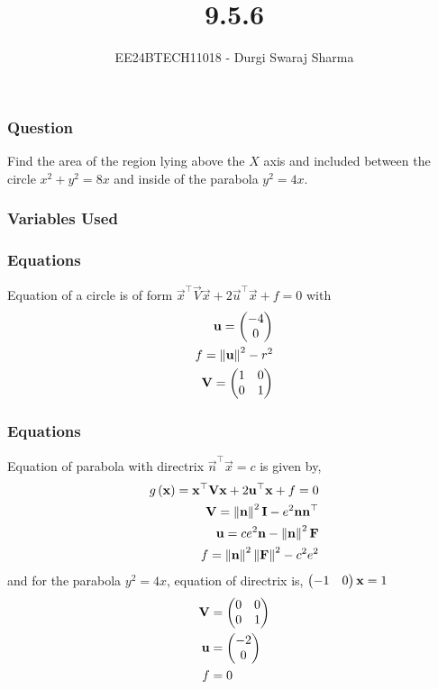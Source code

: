 \documentclass{beamer}
\begin{document}
\title{9.5.6}
\author{EE24BTECH11018 - Durgi Swaraj Sharma}
\date{}
\frame{\titlepage}

\begin{frame}
\frametitle{Question}
Find the area of the region lying above the $X$ axis and included between the circle $x^2+y^2=8x$ and inside of the parabola $y^2=4x$. \hfill {}
\end{frame}

\begin{frame}
\frametitle{Variables Used}
\begin{table}[h!] 
  \centering
  
  \label{tab9-5.6-1}
\end{table}
\end{frame}
\begin{frame}
\frametitle{Equations}
Equation of a circle is of form $\vec{x}^{\top}\vec{V}\vec{x}+2\vec{u}^{\top}\vec{x}+f=0$ with
\begin{align}
	\mathbf{u}=\begin{pmatrix}-4\\0\end{pmatrix}\\
	f=\left\lVert\mathbf{u}\right\rVert^2-r^2\\
	\mathbf{V}=\begin{pmatrix}1&0\\0&1\end{pmatrix}
\end{align}
\end{frame}

\begin{frame}
	\frametitle{Equations}
Equation of parabola with directrix $\vec{n}^{\top}\vec{x}=c$ is given by,
\begin{align}
	g\left(\mathbf{x}\right)=\mathbf{x}^{\top}\mathbf{V}\mathbf{x}+2\mathbf{u}^{\top}\mathbf{x}+f=0\\
	\mathbf{V}=\left\lVert\mathbf{n}\right\rVert^2\mathbf{I}-e^2\mathbf{n}\mathbf{n}^{\top}\\
	\mathbf{u}=ce^2\mathbf{n}-\left\lVert\mathbf{n}\right\rVert^2\mathbf{F}\\
	f=\left\lVert\mathbf{n}\right\rVert^2\left\lVert\mathbf{F}\right\rVert^2-c^2e^2
\end{align}
and for the parabola $y^2=4x$, equation of directrix is, $\begin{pmatrix}-1&0\end{pmatrix}\mathbf{x}=1$
\begin{align}
	\mathbf{V}&=\begin{pmatrix}0&0\\0&1\end{pmatrix}\\
	\mathbf{u}&=\begin{pmatrix}-2\\0\end{pmatrix}\\
	f&=0
\end{align}
\end{frame}
\end{document}

